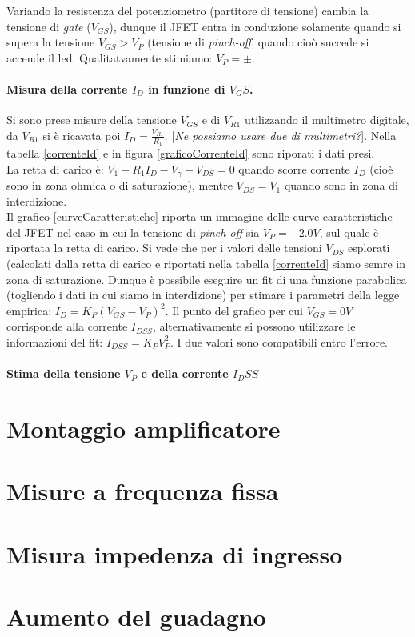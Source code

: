 \documentclass[10pt,a4paper]{article}
\newcommand{\rem}[1]{[\emph{#1}]}
\begin{document}
Variando la resistenza del potenziometro (partitore di tensione) cambia la tensione di \emph{gate} ($V_{GS}$), dunque il JFET entra in conduzione solamente quando si supera la tensione $V_{GS} > V_{P}$ (tensione di \emph{pinch-off}, quando cioò succede si accende il led. Qualitatvamente stimiamo: $V_P = \pm$.
\paragraph{Misura della corrente $I_D$ in funzione di $V_GS$.}
Si sono prese misure della tensione $V_{GS}$ e di $V_{R1}$ utilizzando il multimetro digitale, da $V_{R1}$ si è ricavata poi $I_D = \frac{V_{R1}}{R_1}$. \rem{Ne possiamo usare due di multimetri?}. Nella tabella \ref{correnteId} e in figura \ref{graficoCorrenteId} sono riporati i dati presi. \\
La retta di carico è: $V_1 - R_1 I_D-V_{\gamma}-V_{DS} = 0$ quando scorre corrente $I_D$ (cioè sono in zona ohmica o di saturazione), mentre $V_{DS} = V_1$ quando sono in zona di interdizione.\\
Il grafico \ref{curveCaratteristiche} riporta un immagine delle curve caratteristiche del JFET nel caso in cui la tensione di \emph{pinch-off} sia $V_P = -2.0 V$, sul quale è riportata la retta di carico. Si vede che per i valori delle tensioni $V_{DS}$ esplorati (calcolati dalla retta di carico e riportati nella tabella \ref{correnteId} siamo semre in zona di saturazione. Dunque è possibile eseguire un fit di una funzione parabolica (togliendo i dati in cui siamo in interdizione) per stimare i parametri della legge empirica: $I_D = K_P (V_{GS} - V_P)^2$. Il punto del grafico per cui $V_{GS} = 0 V$ corrisponde alla corrente $I_{DSS}$, alternativamente si possono utilizzare le informazioni del fit: $I_{DSS} = K_P V_{P}^2$. I due valori sono compatibili entro l'errore.

\paragraph{Stima della tensione $V_P$ e della corrente $I_DSS$}

\section{Montaggio amplificatore}

\section{Misure a frequenza fissa}
\section{Misura impedenza di ingresso}
\section{Aumento del guadagno}
\end{document}
